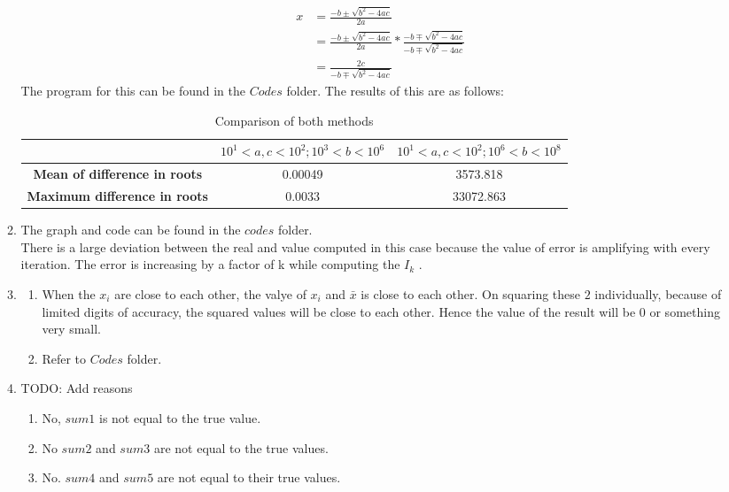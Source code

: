 \documentclass[11pt]{article}
\begin{document}
\begin{enumerate}
\begin{enumerate}
\begin{align*}
							x &= \frac{-b \pm \sqrt{b^2 -4ac}}{2a} \\
							  &= \frac{-b \pm \sqrt{b^2 -4ac}}{2a} * \frac{-b \mp \sqrt{b^2 -4ac}}{-b \mp \sqrt{b^2 -4ac}} \\
							&= \frac{2c}{-b \mp \sqrt{b^2 -4ac}}
					\end{align*}
				The program for this can be found in the $Codes$ folder.
				The results of this are as follows:
				\begin{table}[!htb]
				\centering
				\caption{Comparison of both methods}
				\label{my-label}
				\begin{tabular}{|c|c|c|}
				\hline
				\textbf{}                                     & $10^1<a,c<10^2 ;  10^3<b<10^6$ &   $10^1<a,c<10^2 ;  10^6<b<10^8$         \\ \hline
				\textbf{Mean of difference in roots}          & 0.00049                        & 3573.818  \\ \hline
				\textbf{Maximum difference in roots} & 0.0033                         & 33072.863 \\ \hline
				\end{tabular}
				\end{table}
			\item %
					The graph and code can be found in the $codes$ folder. \\
					There is a large deviation between the real and value computed in this case because the value of error is amplifying with every iteration. The error is increasing by a factor of k while computing the $I_k$ .
			\item %
				\begin{enumerate}
					\item When the $x_i$ are close to each other, the valye of $x_i$ and $\bar{x}$ is close to each other. On squaring these $2$ individually, because of limited digits of accuracy, the squared values will be close to each other.
						 Hence the value of the result will be 0 or something very small.
					\item Refer to $Codes$ folder. 
				\end{enumerate}
			\item %
				TODO: Add reasons
				\begin{enumerate}
					\item No, $sum1$ is not equal to the true value.
					\item No $sum2$ and $sum3$ are not equal to the true values.
					\item No. $sum4$ and $sum5$ are not equal to their true values.

\end{enumerate}
\end{enumerate}
\end{enumerate}
\end{document}
